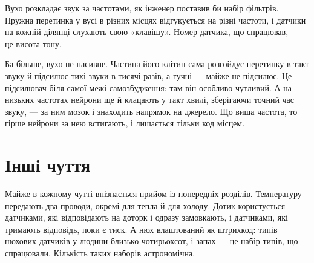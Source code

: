 Вухо розкладає звук за частотами, як інженер поставив би набір фільтрів. Пружна перетинка у вусі в різних місцях відгукується на різні частоти, і датчики на кожній ділянці слухають свою «клавішу». Номер датчика, що спрацював, --- це висота тону.


Ба більше, вухо не пасивне. Частина його клітин сама розгойдує перетинку в такт звуку й підсилює тихі звуки в тисячі разів, а гучні --- майже не підсилює. Це підсилювач біля самої межі самозбудження: там він особливо чутливий. А на низьких частотах нейрони ще й клацають у такт хвилі, зберігаючи точний час звуку, --- за ним мозок і знаходить напрямок на джерело. Що вища частота, то гірше нейрони за нею встигають, і лишається тільки код місцем.

\section*{Інші чуття}

Майже в кожному чутті впізнається прийом із попередніх розділів. Температуру передають два проводи, окремі для тепла й для холоду. Дотик користується датчиками, які відповідають на доторк і одразу замовкають, і датчиками, які тримають відповідь, поки є тиск. А нюх влаштований як штрихкод: типів нюхових датчиків у людини близько чотирьохсот, і запах --- це набір типів, що спрацювали. Кількість таких наборів астрономічна.


